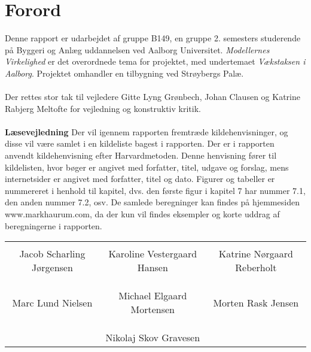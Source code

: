 \chapter*{Forord}
Denne rapport er udarbejdet af gruppe B149, en gruppe 2. semesters studerende på Byggeri og Anlæg uddannelsen ved Aalborg Universitet. \textit{Modellernes Virkelighed} er det overordnede tema for projektet, med undertemaet \textit{Vækstaksen i Aalborg}. Projektet omhandler en tilbygning ved Strøybergs Palæ.
\\
\\
Der rettes stor tak til vejledere Gitte Lyng Grønbech, Johan Clausen og Katrine Rabjerg Meltofte for vejledning og konstruktiv kritik. 
\\
\\
\textbf{Læsevejledning}
\newline
Der vil igennem rapporten fremtræde kildehenvisninger, og disse vil være samlet i en kildeliste bagest i rapporten. Der er i rapporten anvendt kildehenvisning efter Harvardmetoden. Denne henvisning fører til kildelisten, hvor bøger er angivet med forfatter, titel, udgave og forslag, mens internetsider er angivet med forfatter, titel og dato. Figurer og tabeller er nummereret i henhold til kapitel, dvs. den første figur i kapitel 7 har nummer 7.1, den anden nummer 7.2, osv. De samlede beregninger kan findes på hjemmesiden www.markhaurum.com, da der kun vil findes eksempler og korte uddrag af beregningerne i rapporten.


\phantom{Luft}

\phantom{Luft}

\begin{table}[H]
	\centering
		\begin{tabular}{c c c}
			\underline{\phantom{mmmmmmmmmmmmmm}} & \underline{\phantom{mmmmmmmmmmmmmm}} & \underline{\phantom{mmmmmmmmmmmmmm}} \\
			Jacob Scharling Jørgensen			& Karoline Vestergaard Hansen 		& Katrine Nørgaard Reberholt 			\\
			&&\\
			&&\\
			\underline{\phantom{mmmmmmmmmmmmmm}} & \underline{\phantom{mmmmmmmmmmmmmm}} & \underline{\phantom{mmmmmmmmmmmmmm}} \\
			Marc Lund Nielsen			& Michael Elgaard Mortensen 		& Morten Rask Jensen 				\\
			&&\\
			&&\\
		& \underline{\phantom{mmmmmmmmmmmmmm}} 	&			\\														
		& Nikolaj Skov Gravesen 							& 					
		\end{tabular}
\end{table}